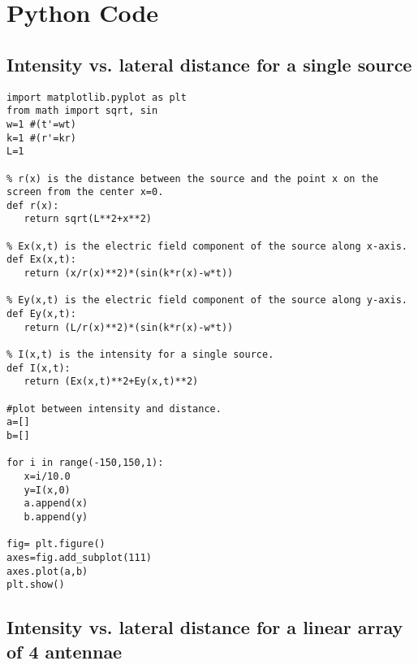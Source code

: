 \chapter{Python Code}

\section{Intensity vs. lateral distance for a single source}\label{code:single}

\begin{Verbatim}[fontsize=\small,baselinestretch=0.9]
import matplotlib.pyplot as plt
from math import sqrt, sin
w=1 #(t'=wt)
k=1 #(r'=kr)
L=1

% r(x) is the distance between the source and the point x on the screen from the center x=0.
def r(x):
   return sqrt(L**2+x**2)

% Ex(x,t) is the electric field component of the source along x-axis.
def Ex(x,t):
   return (x/r(x)**2)*(sin(k*r(x)-w*t))

% Ey(x,t) is the electric field component of the source along y-axis.
def Ey(x,t):
   return (L/r(x)**2)*(sin(k*r(x)-w*t))

% I(x,t) is the intensity for a single source.
def I(x,t):
   return (Ex(x,t)**2+Ey(x,t)**2)

#plot between intensity and distance.
a=[]
b=[]

for i in range(-150,150,1):
   x=i/10.0
   y=I(x,0)
   a.append(x)
   b.append(y)

fig= plt.figure()
axes=fig.add_subplot(111)
axes.plot(a,b)
plt.show()
\end{Verbatim}


\section{Intensity vs. lateral distance for a linear array of 4 antennae}\label{code:four}

